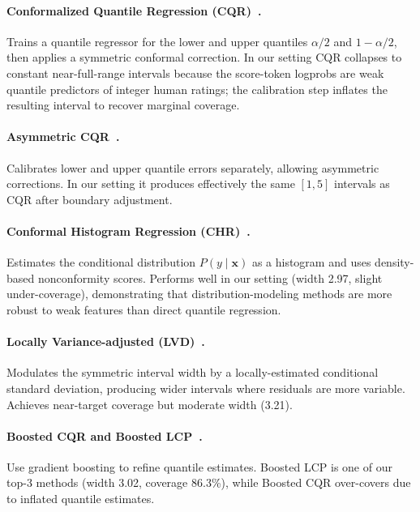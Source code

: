\documentclass{article}
\begin{document}
\paragraph{Conformalized Quantile Regression (CQR)~\citep{romano2019conformalized}.}
Trains a quantile regressor for the lower and upper quantiles $\alpha/2$ and $1-\alpha/2$, then applies a symmetric conformal correction. In our setting CQR collapses to constant near-full-range intervals because the score-token logprobs are weak quantile predictors of integer human ratings; the calibration step inflates the resulting interval to recover marginal coverage.

\paragraph{Asymmetric CQR~\citep{sesia2020comparison}.}
Calibrates lower and upper quantile errors separately, allowing asymmetric corrections. In our setting it produces effectively the same $[1, 5]$ intervals as CQR after boundary adjustment.

\paragraph{Conformal Histogram Regression (CHR)~\citep{sesia2021conformal}.}
Estimates the conditional distribution $P(y \mid \mathbf{x})$ as a histogram and uses density-based nonconformity scores. Performs well in our setting (width 2.97, slight under-coverage), demonstrating that distribution-modeling methods are more robust to weak features than direct quantile regression.

\paragraph{Locally Variance-adjusted (LVD)~\citep{lin2021locally}.}
Modulates the symmetric interval width by a locally-estimated conditional standard deviation, producing wider intervals where residuals are more variable. Achieves near-target coverage but moderate width (3.21).

\paragraph{Boosted CQR and Boosted LCP~\citep{xie2024boosted}.}
Use gradient boosting to refine quantile estimates. Boosted LCP is one of our top-3 methods (width 3.02, coverage 86.3\%), while Boosted CQR over-covers due to inflated quantile estimates.
\end{document}
